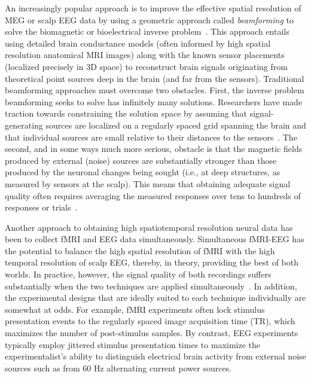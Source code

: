 \documentclass[11pt]{article}
\begin{document}
An increasingly popular approach is to improve the effective spatial
resolution of MEG or scalp EEG data by using a geometric approach
called \textit{beamforming} to solve the biomagnetic or bioelectrical
inverse problem~\citep{Sarv87}.  This approach entails using detailed
brain conductance models (often informed by high spatial resolution
anatomical MRI images) along with the known sensor placements
(localized precisely in 3D space) to reconstruct brain signals
originating from theoretical point sources deep in the brain (and far
from the sensors).  Traditional beamforming approaches must overcome
two obstacles.  First, the inverse problem beamforming seeks to solve
has infinitely many solutions.  Researchers have made traction towards
constraining the solution space by assuming that signal-generating
sources are localized on a regularly spaced grid spanning the brain
and that individual sources are small relative to their distances to
the sensors~\citep{Snyd91, BailEtal01, HillEtal05}.  The second, and in
some ways much more serious, obstacle is that the magnetic fields
produced by external (noise) sources are substantially stronger than
those produced by the neuronal changes being sought (i.e., at deep
structures, as measured by sensors at the scalp).  This means that
obtaining adequate signal quality often requires averaging the
measured responses over tens to hundreds of responses or trials~\citep[e.g., see review by][]{HillEtal05}.

Another approach to obtaining high spatiotemporal resolution neural data has
been to collect fMRI and EEG data simultaneously. Simultaneous fMRI-EEG has the
potential to balance the high spatial resolution of fMRI with the high temporal
resolution of scalp EEG, thereby, in theory, providing the best of both worlds.
In practice, however, the signal quality of both recordings suffers
substantially when the two techniques are applied simultaneously~\citep[e.g.,
see review by][]{HustEtal12}. In addition, the experimental designs that are
ideally suited to each technique individually are somewhat at odds. For example,
fMRI experiments often lock stimulus presentation events to the regularly spaced
image acquisition time (TR), which maximizes the number of post-stimulus
samples.  By contrast, EEG experiments typically employ jittered stimulus
presentation times to maximize the experimentalist's ability to distinguish
electrical brain activity from external noise sources such as from 60 Hz
alternating current power sources.
\end{document}
